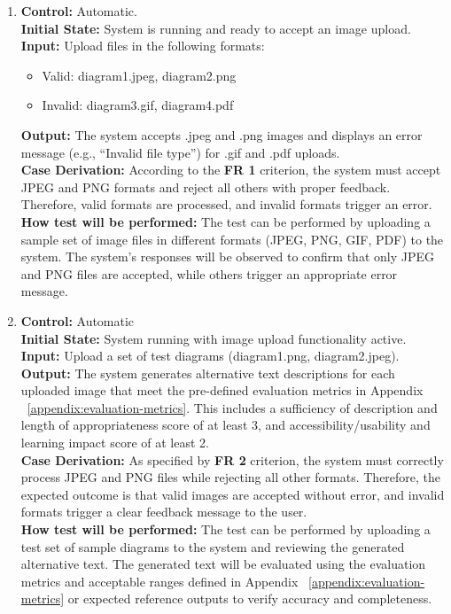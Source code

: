 \documentclass[12pt, titlepage]{article}
\begin{document}
\begin{enumerate}[label=FR-ST \arabic*., wide=0pt, leftmargin=*]
  \item{}
    {\bf Control:} Automatic. \\
    {\bf Initial State:} System is running and ready to accept an
    image upload.\\
    {\bf Input:} Upload files in the following formats:
    \begin{itemize}
      \item Valid: diagram1.jpeg, diagram2.png
      \item Invalid: diagram3.gif, diagram4.pdf
    \end{itemize}
    {\bf Output:} The system accepts .jpeg and .png images and
    displays an error message (e.g., “Invalid file type”) for .gif
    and .pdf uploads.\\
    {\bf  Case Derivation:} According to the \textbf{FR 1} criterion, the system
    must accept JPEG and PNG formats and reject all others with proper
    feedback. Therefore, valid formats are processed, and invalid
    formats trigger an error.\\
    {\bf How test will be performed:} The test can be performed by
    uploading a sample set of image files in different formats (JPEG,
    PNG, GIF, PDF) to the system. The system’s responses will be
    observed to confirm that only JPEG and PNG files are accepted,
    while others trigger an appropriate error message.\\

  \item{}
    {\bf Control:} Automatic\\
    {\bf Initial State:} System running with image upload
    functionality active.\\
    {\bf Input:} Upload a set of test diagrams (diagram1.png, diagram2.jpeg).\\
    {\bf Output:} The system generates alternative text descriptions
    for each uploaded image that meet the pre-defined evaluation metrics in Appendix ~\ref{appendix:evaluation-metrics}. 
    This includes a sufficiency of description and length of appropriateness score of at least 3, and 
    accessibility/usability and learning impact score of at least 2. \\
    {\bf  Case Derivation:} As specified by \textbf{FR 2} criterion,
    the system must correctly process JPEG and PNG files while
    rejecting all other formats. Therefore, the expected outcome is
    that valid images are accepted without error, and invalid formats
    trigger a clear feedback message to the user.\\
    {\bf How test will be performed:} The test can be performed by
    uploading a test set of sample diagrams to the system and
    reviewing the generated alternative text. The generated text will
    be evaluated using the evaluation metrics and acceptable ranges defined in 
    Appendix ~\ref{appendix:evaluation-metrics} or expected
    reference outputs to verify accuracy and completeness.\\


\end{enumerate}
\end{document}

